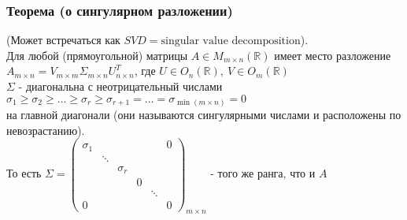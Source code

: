 \documentclass[12pt, letterpaper, twoside]{article}
\newcommand{\mb}[1]{\mathbb{#1}}
\begin{document}
    \subsubsection*{Теорема (о сингулярном разложении)}
    (Может встречаться как $SVD = \text{singular value decomposition}$).\\
    Для любой (прямоугольной) матрицы $A\in M_{m\times n}{(\mb{R})}$ имеет место разложение $A_{m\times n} = V_{m\times m} \Sigma_{m\times n}U^T_{n\times n}$, где 
    $U\in O_n(\mb{R}),\ V\in O_m (\mb{R})$\\
    $\Sigma$ - диагональна с неотрицательный числами $\sigma_1 \geq \sigma_2 \geq \dots \geq \sigma_{r} \geq \sigma_{r + 1} = \dots = \sigma_{\min(m\times n)} = 0$\\
    на главной диагонали (они называются сингулярными числами и расположены по невозрастанию).\\
    То есть $\Sigma = \begin{pmatrix}
        \sigma_1 &        &          &      &       & 0\\
                 & \ddots &          &      &       &\\
                 &        & \sigma_r &      &       &\\
                 &        &          & 0    &       &\\
                 &        &          &      &\ddots &\\
        0        &        &          &      &       & 0
    \end{pmatrix}_{m\times n}$ - того же ранга, что и $A$\\
    
\end{document}

